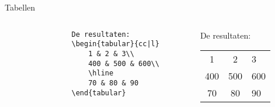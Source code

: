 \copyrightVincent

\begin{frame}[fragile]{Tabellen}
    \begin{columns}
        \begin{column}{0.5\textwidth}
            \begin{verbatim}
                De resultaten:
                \begin{tabular}{cc|l}
                    1 & 2 & 3\\
                    400 & 500 & 600\\
                    \hline
                    70 & 80 & 90
                \end{tabular}
            \end{verbatim}
        \end{column}
        \begin{column}{0.5\textwidth}
            \begin{adjustbox}{frame=1pt 10pt}%
                \begin{minipage}{\textwidth-22pt}
                    De resultaten:
                    \begin{tabular}{cc|l}
                        1   & 2   & 3   \\
                        400 & 500 & 600 \\
                        \hline
                        70  & 80  & 90
                    \end{tabular}
                \end{minipage}
            \end{adjustbox}
        \end{column}
    \end{columns}


\end{frame}
